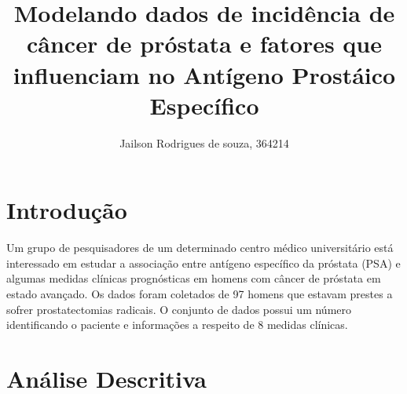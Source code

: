 \documentclass[runningheads]{llncs}\usepackage[]{graphicx}\usepackage[]{color}
\begin{document}
\title{Modelando dados de incidência de câncer de próstata e fatores que influenciam no Antígeno Prostáico Específico}
\author{Jailson Rodrigues de souza, 364214}
\maketitle            
\section{Introdução}

Um grupo de pesquisadores de um determinado centro médico universitário está interessado em estudar a associação entre antígeno específico da próstata (PSA) e algumas medidas clínicas prognósticas em homens com câncer de próstata em estado avançado. Os dados foram coletados de 97 homens que estavam prestes a sofrer prostatectomias radicais. O conjunto de dados possui um número identificando o paciente e informações a respeito de 8 medidas clínicas.
\newpage

\section{Análise Descritiva}


\end{document}
